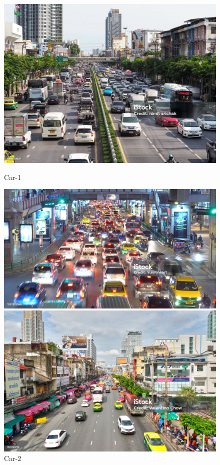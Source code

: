 \begin{figure}[H]
  \begin{minipage}{0.48\textwidth}
    \centering
    \includegraphics[width=\linewidth]{tex/img/car-1.jpg}
    \caption{Car-1}
    \label{fig:YOLO-NASSM_vs_other_models}
  \end{minipage}%
  \begin{minipage}{0.5\textwidth}
    \centering
    \includegraphics[width=\linewidth]{tex/img/car-4.jpg}
    \caption{Car-2}
    \label{fig:YOLO-NAS_vs_other_models}
  \end{minipage}
  \begin{minipage}{0.5\textwidth}
    \centering
    \includegraphics[width=\linewidth]{tex/img/car-8.jpg}

\end{minipage}
\end{figure}
